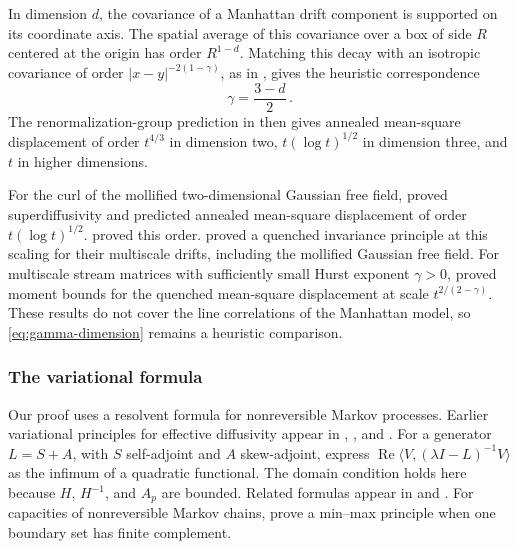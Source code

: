 \documentclass[11pt]{amsart}
\theoremstyle{plain}
\theoremstyle{definition}
\newcommand{\1}{\mathbf 1}
\newcommand{\ip}[2]{\langle #1,#2\rangle}
\newcommand{\abs}[1]{\lvert #1\rvert}
\begin{document}
In dimension $d$, the covariance of a Manhattan drift component is
supported on its coordinate axis.  The spatial average of this covariance
over a box of side $R$ centered at the origin has order $R^{1-d}$.
Matching this decay with an isotropic covariance of order
$\abs{x-y}^{-2(1-\gamma)}$, as in \citet*[(1.2)]{ABK26}, gives the heuristic
correspondence
\begin{equation}\label{eq:gamma-dimension}
  \gamma=\frac{3-d}{2}\, .
\end{equation}
The renormalization-group prediction in \citet*[(1.3)]{ABK26} then gives
annealed mean-square displacement of order $t^{4/3}$ in dimension two, $t(\log t)^{1/2}$ in
dimension three, and $t$ in higher dimensions.

For the curl of the mollified two-dimensional Gaussian free field,
\citet*[Theorem~1 and Remark~2]{TV12} proved superdiffusivity and predicted
annealed mean-square displacement of order $t(\log t)^{1/2}$.
\citet*[Theorem~1.1]{CMOW25} proved this order.
\citet*[Theorem~A and Section~1.2]{ABK24} proved a
quenched invariance principle at this scaling for their multiscale drifts,
including the mollified Gaussian free field.
For multiscale stream matrices with sufficiently small Hurst exponent
$\gamma>0$, \citet*[Theorem~A and assumptions~\textup{(J1)--(J4)}]{ABK26}
proved moment bounds for the quenched mean-square displacement at scale
$t^{2/(2-\gamma)}$.  These results do not cover the line correlations of
the Manhattan model, so \eqref{eq:gamma-dimension} remains a heuristic
comparison.

\subsubsection{The variational formula}\label{sssec:variational}

Our proof uses a resolvent formula for nonreversible Markov processes.
Earlier variational principles for effective diffusivity appear in
\citet*[Section~V.1, (5.20)]{AM91},
\citet*[Sections~4.1--4.2.1, (4.22) and (4.43)--(4.44)]{FP96}, and
\citet*[Proposition~5.1, (5.1)--(5.2)]{LOY98}.
For a generator $L=S+A$, with $S$ self-adjoint and $A$ skew-adjoint,
\citet*[Theorem~4.1]{KLO12} express
$\operatorname{Re}\ip V{(\lambda I-L)^{-1}V}$ as the infimum of a
quadratic functional.  The domain condition holds here because
$H$, $H^{-1}$, and $A_p$ are bounded.  Related formulas appear in
\citet*[(2.17)]{LQSY04} and \citet*[(39)]{Tot18}.
For capacities of nonreversible Markov chains,
\citet*[Theorem~2.4 and Section~2.3]{GL14} prove a min--max principle when
one boundary set has finite complement.
\end{document}
